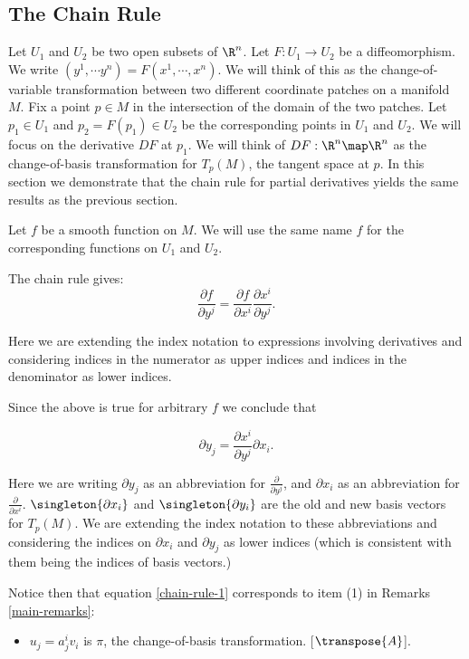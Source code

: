 \documentclass[oneside,12pt]{amsart}
\begin{document}
\subsection{The Chain Rule}
Let $U_1$ and $U_2$ be two open subsets of $\R^n$. Let $F:U_1 \to U_2$ be a diffeomorphism.
We write $(y^1,\cdots y^n) = F(x^1, \cdots, x^n)$.
We will think of this as the change-of-variable transformation between two different coordinate patches
on a manifold $M$. Fix a point $p\in M$ in the intersection of the domain of the two patches. Let 
$p_1 \in U_1$ and $p_2 = F(p_1) \in U_2$ be the corresponding points in $U_1$ and $U_2$.
We will focus on the derivative $DF$ at $p_1$. 
We will think of $DF:\R^n\map\R^n$ as the change-of-basis transformation for
$T_p(M)$, the tangent space at $p$. In this section we demonstrate that the
chain rule for partial derivatives yields the same results as the previous section.

Let $f$ be a smooth function on $M$. We will use the same name $f$ for the corresponding functions on 
$U_1$ and $U_2$.

The chain rule gives: 
$$\frac{\partial f}{\partial y^j} = \frac{\partial f}{\partial x^i}\frac{\partial x^i}{\partial y^j}.$$

Here we are extending the index notation to expressions involving derivatives and considering indices in the numerator as upper indices and indices in the denominator as lower indices.

Since the above is true for arbitrary $f$ we conclude that

\begin{equation}
\label{chain-rule-1}
\partial y_j = \frac{\partial x^i}{\partial y^j} \partial x_i.
\end{equation}

Here we are writing $\partial y_j$ as an abbreviation for $\frac{\partial}{\partial y^j}$,
and $\partial x_i$ as an abbreviation for $\frac{\partial}{\partial x^i}$.
$\singleton{\partial x_i}$ and $\singleton{\partial y_i}$ are the old and new basis
vectors for $T_p(M)$. We are extending the index notation to these abbreviations
and considering the indices on $\partial x_i$ and $\partial y_j$ as lower indices (which
is consistent with them being the indices of basis vectors.)

Notice then that equation \ref{chain-rule-1} corresponds to item (1) in Remarks \ref{main-remarks}:

\begin{itemize}
\item $u_j = a^i_j v_i$ is $\pi$, the change-of-basis transformation. [$\transpose{A}$].
\end{itemize}
\end{document}
